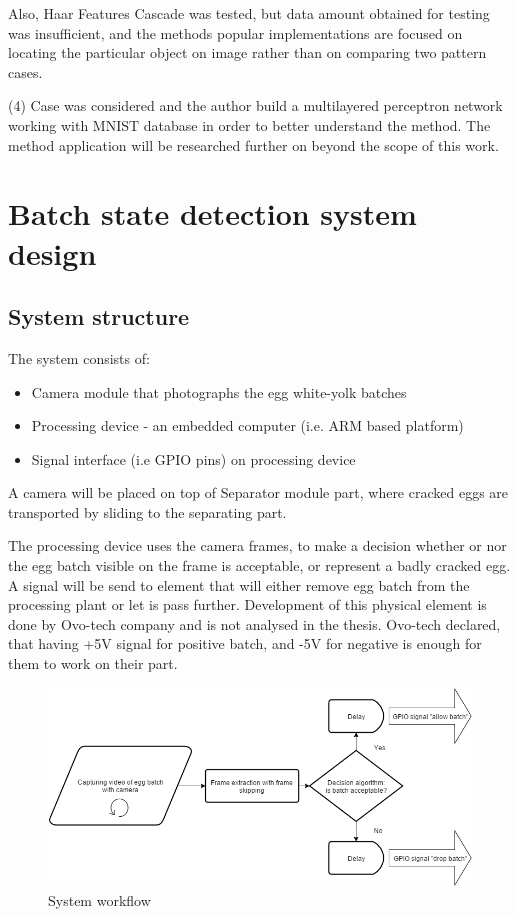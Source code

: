 \documentclass[12pt,twoside,a4paper]{article}
\begin{document}
Also, Haar Features Cascade was tested, but data amount obtained for testing was insufficient, and the methods popular implementations are focused on locating the particular object on image rather than on comparing two pattern cases.

(4) Case was considered and the author build a multilayered perceptron network working with MNIST database in order to better understand the method.
The method application will be researched further on beyond the scope of this work.






\section{Batch state detection system design}

\subsection{System structure}
The system consists of:
\begin{itemize}
\item Camera module that photographs the egg white-yolk batches
\item Processing device - an embedded computer (i.e. ARM based platform)
\item Signal interface (i.e GPIO pins) on processing device
\end{itemize}

A camera will be placed on top of Separator module part, where cracked eggs are transported by sliding to the separating part.

The processing device uses the camera frames, to make a decision whether or nor the egg batch visible on the frame is acceptable, or represent a badly cracked egg.
A signal will be send to element that will either remove egg batch from the processing plant or let is pass further.
Development of this physical element is done by Ovo-tech company and is not analysed in the thesis. Ovo-tech declared, that having +5V signal for positive batch, and -5V for negative is enough for them to work on their part.


\begin{figure}[H]
\centering
\includegraphics[width=0.8\paperwidth]{system}
\caption{System workflow}
\end{figure}
\end{document}
